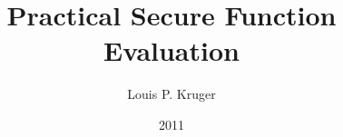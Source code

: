 
\clearpage{}  %

\title{Practical Secure Function Evaluation}
\author{Louis P. Kruger}
\date{2011}
\dissertation
{}
\maketitle

\copyrightpage




\begin{abstract}
    \singlespace
    
\end{abstract}
~\newpage

\begin{acknowledgments}
    \singlespace
    
\end{acknowledgments}

\tableofcontents
\listoftables
\listoffigures

%

\clearpage{} %
